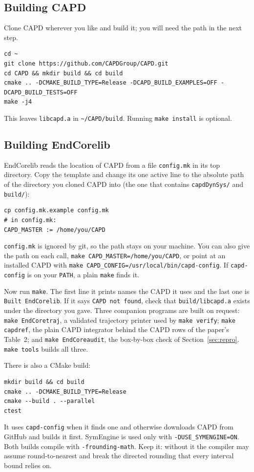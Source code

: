 \documentclass[11pt,a4paper]{article}
\newcommand{\file}[1]{\nolinkurl{#1}}
\begin{document}
\subsection{Building CAPD}

Clone CAPD wherever you like and build it; you will need the path in the
next step.
\begin{Verbatim}
cd ~
git clone https://github.com/CAPDGroup/CAPD.git
cd CAPD && mkdir build && cd build
cmake .. -DCMAKE_BUILD_TYPE=Release -DCAPD_BUILD_EXAMPLES=OFF -DCAPD_BUILD_TESTS=OFF
make -j4
\end{Verbatim}
This leaves \file{libcapd.a} in \file{~/CAPD/build}. Running
\verb|make install| is optional.

\subsection{Building EndCorelib}

EndCorelib reads the location of CAPD from a file \file{config.mk} in its top
directory. Copy the template and change its one active line to the absolute
path of the directory you cloned CAPD into (the one that contains
\file{capdDynSys/} and \file{build/}):
\begin{Verbatim}
cp config.mk.example config.mk
# in config.mk:
CAPD_MASTER := /home/you/CAPD
\end{Verbatim}
\file{config.mk} is ignored by git, so the path stays on your machine. You
can also give the path on each call, \verb|make CAPD_MASTER=/home/you/CAPD|,
or point at an installed CAPD with
\verb|make CAPD_CONFIG=/usr/local/bin/capd-config|. If \texttt{capd-config}
is on your \texttt{PATH}, a plain \texttt{make} finds it.

Now run \texttt{make}. The first line it prints names the CAPD it uses and
the last one is \texttt{Built EndCorelib}. If it says \texttt{CAPD not found},
check that \file{build/libcapd.a} exists under the directory you gave. Three
companion programs are built on request: \texttt{make EndCoretraj}, a
validated trajectory printer used by \texttt{make verify};
\texttt{make capdref}, the plain CAPD integrator behind the CAPD rows of the
paper's Table~2; and \texttt{make EndCoreaudit}, the box-by-box check of
Section~\ref{sec:repro}. \texttt{make tools} builds all three.

There is also a CMake build:
\begin{Verbatim}
mkdir build && cd build
cmake .. -DCMAKE_BUILD_TYPE=Release
cmake --build . --parallel
ctest
\end{Verbatim}
It uses \texttt{capd-config} when it finds one and otherwise downloads CAPD
from GitHub and builds it first. SymEngine is used only with
\verb|-DUSE_SYMENGINE=ON|. Both builds compile with
\verb|-frounding-math|. Keep it: without it the compiler may assume
round-to-nearest and break the directed rounding that every interval bound
relies on.
\end{document}

